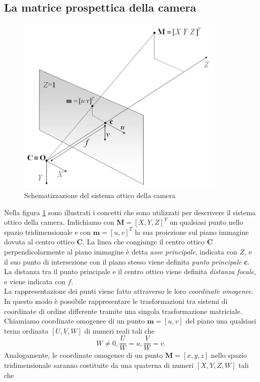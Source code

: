 \subsection{La matrice prospettica della camera}
\begin{figure}
	\centering
	\includegraphics[width=10cm]{./pictures/modelloCamera}
	\caption{Schematizzazione del sistema ottico della camera}
	\label{fig:modelloCamera}
\end{figure} 
Nella figura \ref{fig:modelloCamera} sono illustrati i concetti che sono utilizzati per descrivere il sistema ottico della camera.
Indichiamo con $\textbf{M}=[X, Y, Z]^\textit{T}$ un qualsiasi punto nello spazio tridimensionale e con $\textbf{m} = [u, v]^\textit{T}$ la sua proiezione sul piano immagine dovuta al centro ottico $\textbf{C}$.
La linea che congiunge il centro ottico $\textbf{C}$ perpendicolarmente al piano immagine \`e detta \textit{asse principale}, indicata con $Z$, e il suo punto di intersezione con il piano stesso viene definita \textit{punto principale} $\textbf{c}$.
La distanza tra il punto principale e il centro ottico viene definita \textit{distanza focale},  e viene indicata con $f$.\\
La rappresentazione dei punti viene fatto attraverso le loro \textit{coordinate omogenee}.
In questo modo \`e possibile rappresentare le trasformazioni tra sistemi di coordinate di ordine differente tramite una singola trasformazione matriciale.
Chiamiamo coordinate omogenee di un punto $\textbf{m} = [u,v]$ del piano una qualsiasi terna ordinata $[U,V,W]$ di numeri reali tali che
\[W\neq 0,
\frac{U}{W}=u,
\frac{V}{W}=v.\]
Analogamente, le coordinate omogenee di un punto $\textbf{M}=[x,y,z]$ nello spazio tridimensionale saranno costituite da una quaterna di numeri $[X,Y,Z,W]$ tali che 
